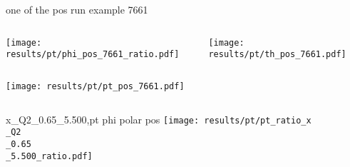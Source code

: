 \begin{frame}{one of the pos run example 7661}
\begin{columns}
\begin{column}[T]{0.5\textwidth}
\texttt{[image: results/pt/phi\_pos\_7661\_ratio.pdf]}
\end{column}
\begin{column}[T]{0.5\textwidth}
\texttt{[image: results/pt/th\_pos\_7661.pdf]}
\end{column}
\end{columns}
\begin{columns}
\begin{column}[T]{0.5\textwidth}
\texttt{[image: results/pt/pt\_pos\_7661.pdf]}
\end{column}
\begin{column}[T]{0.5\textwidth}
\end{column}
\end{columns}
\end{frame}
\begin{frame}{x\_Q2\_0.65\_5.500,pt phi polar pos}
\texttt{[image: results/pt/pt\_ratio\_x\\\_Q2\\\_0.65\\\_5.500\_ratio.pdf]}
\end{frame}
